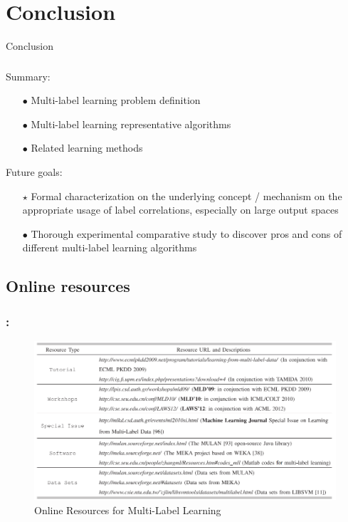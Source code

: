 \documentclass{beamer}
\begin{document}
\section{Conclusion}
\begin{frame}
\Huge{\centerline{Conclusion}}
\end{frame}
\begin{frame}
\frametitle{\insertsection}
Summary:
\begin{itemize}
\item[$\bullet$] Multi-label learning problem definition
\item[$\bullet$] Multi-label learning representative algorithms
\item[$\bullet$] Related learning methods
\end{itemize}

Future goals:
\begin{itemize}
\item[$\star$] Formal characterization on the underlying concept / mechanism on the appropriate usage of label correlations, especially on large output spaces
\item[$\bullet$] Thorough experimental comparative study to discover pros and cons of different multi-label learning algorithms
\end{itemize}
\end{frame}

\subsection{Online resources}
\begin{frame}
\frametitle{\insertsection : \insertsubsection}
\begin{figure}
	\begin{center}
		\includegraphics[scale = 0.47]{images/online.png}
		\caption{Online Resources for Multi-Label Learning}
	\end{center}
\end{figure}
\end{frame}
\end{document}
